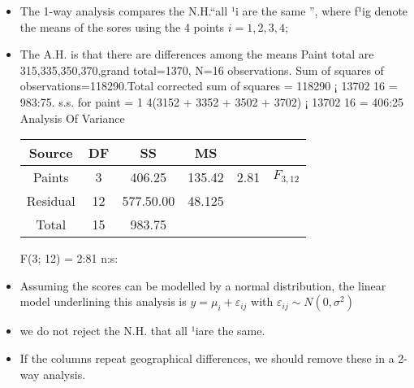 \documentclass[a4paper,12pt]{article}
\begin{document}
\begin{itemize}
    \item The 1-way analysis compares the N.H.“all ¹i are the same ”, where f¹ig denote
the means of the sores using the 4 points $i=1,2,3,4$; 

\item The A.H. is that there are differences
among the means
Paint total are 315,335,350,370,grand total=1370, N=16 observations. Sum of squares
of observations=118290.Total corrected sum of squares = 118290 ¡ 13702
16 = 983:75. s.s.
for paint = 1
4(3152 + 3352 + 3502 + 3702) ¡ 13702
16 = 406:25
Analysis Of Variance

\begin{center}
\begin{tabular}{|c|c|c|c|c|c|} \hline
Source 	&	DF 	&	SS 	&	MS	&		&		\\ \hline
Paints 	&	3	&	406.25	&	 135.42	&	2.81	&	$F_{3,12}$	\\ \hline
Residual 	&	12	&	577.50.00	&	48.125	&		&		\\ \hline
Total 	&	15	&	983.75	&		&		&		\\ \hline
\end{tabular}
\end{center}





F(3; 12) = 2:81 n:s:
\item 
Assuming the scores can be modelled by a normal distribution, the linear model underlining
this analysis is $y = \mu_i + \varepsilon_{ij}$ with $\varepsilon_{ij} \sim N(0, \sigma^2)$
\item we do not reject the N.H. that all
¹iare the same.
\item If the columns repeat geographical differences, we should remove these in a 2-way analysis.
\end{itemize}

\end{document}
